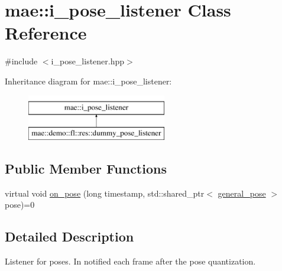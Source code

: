 \hypertarget{classmae_1_1i__pose__listener}{\section{mae\-:\-:i\-\_\-pose\-\_\-listener Class Reference}
\label{classmae_1_1i__pose__listener}
}


{\ttfamily \#include $<$i\-\_\-pose\-\_\-listener.\-hpp$>$}

Inheritance diagram for mae\-:\-:i\-\_\-pose\-\_\-listener\-:\begin{figure}[H]
\begin{center}
\leavevmode
\includegraphics[height=2.000000cm]{classmae_1_1i__pose__listener}
\end{center}
\end{figure}
\subsection*{Public Member Functions}
\begin{DoxyCompactItemize}
\item 
virtual void \hyperlink{classmae_1_1i__pose__listener_a1b7584ba2ad90a2b862d779cb3cba6f5}{on\-\_\-pose} (long timestamp, std\-::shared\-\_\-ptr$<$ \hyperlink{classmae_1_1general__pose}{general\-\_\-pose} $>$ pose)=0
\end{DoxyCompactItemize}


\subsection{Detailed Description}
Listener for poses. In notified each frame after the pose quantization. 


